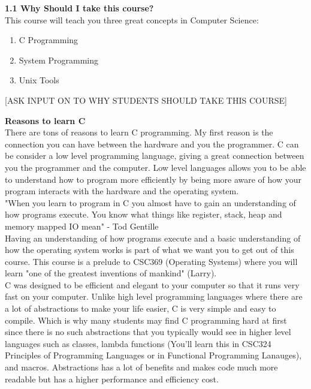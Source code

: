 \documentclass{article}
\begin{document}
\textbf{1.1 Why Should I take this course?}
\\

This course will teach you three great concepts in Computer Science:

\begin{enumerate}
    \item C Programming
    \item System Programming
    \item Unix Tools
\end{enumerate}

[ASK INPUT ON TO WHY STUDENTS SHOULD TAKE THIS COURSE]

\textbf{Reasons to learn C}
\\

There are tons of reasons to learn C programming. My first reason is the connection you can have between the hardware and you the programmer. C can be consider a low level programming language, giving a great connection between you the programmer and the computer. Low level languages allows you to be able to understand how to program more efficiently by being more aware of how your program interacts with the hardware and the operating system. 
\\

"When you learn to program in C you almost have to gain an understanding of how programs execute. You know what things like register, stack, heap and memory mapped IO mean" - Tod Gentille
\\

Having an understanding of how programs execute and a basic understanding of how the operating system works is part of what we want you to get out of this course. This course is a prelude to CSC369 (Operating Systems) where you will learn "one of the greatest inventions of mankind" (Larry). 
\\

C was designed to be efficient and elegant to your computer so that it runs very fast on your computer. Unlike high level programming languages where there are a lot of abstractions to make your life easier, C is very simple and easy to compile. Which is why many students may find C programming hard at first since there is no such abstractions that you typically would see in higher level languages such as classes, lambda functions (You'll learn this in CSC324 Principles of Programming Languages or in Functional Programming Lanauges), and macros. Abstractions has a lot of benefits and makes code much more readable but has a higher performance and efficiency cost. 
\end{document}
